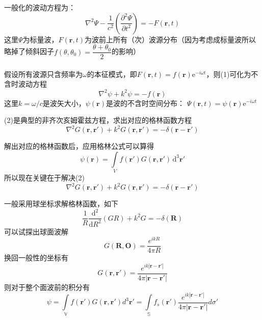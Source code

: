 \documentclass{beamer}
\renewcommand{\bm}{\symbf}
\newenvironment{slide}{
    \begin{frame}{\bfseries{\sectiontitle}}
}{
    \end{frame}
}
\begin{document}
\begin{slide}
    一般化的波动方程为：
    \begin{equation}
        \nabla^2 \Psi - \frac{1}{c^2}\left(\frac{\partial^2 \Psi}{\partial t^2}\right) = -F(\bm{r},t)
    \end{equation}
    这里$\Psi$为标量波，$F(\bm{r},t)$为波前上所有（次）波源分布（因为考虑成标量波所以略掉了倾斜因子$f(\theta,\theta_0)=\dfrac{\theta+\theta_0}{2}$的影响）\\~\\
    假设所有波源只含频率为$\omega$的本征模式，即$F(\bm{r},t)=f(\bm{r})\mathrm{e}^{-i\omega t}$，则(1)可化为不含时波动方程
    \begin{equation}
        \nabla^2 \psi + k^2 \psi = -f(\bm{r})
    \end{equation}
    这里$k=\omega/c$是波矢大小，$\psi(\bm{r})$是波的不含时空间分布：
    $\Psi(\bm{r},t)=\psi(\bm{r})\mathrm{e}^{-i\omega t}$
\end{slide}

\begin{slide}
    (2)是典型的非齐次亥姆霍兹方程，求出对应的格林函数方程
    \begin{equation}
        \nabla^2 G(\bm{r},\bm{r}') + k^2 G(\bm{r},\bm{r}')
        = -\delta(\bm{r}-\bm{r}')
    \end{equation}

    解出对应的格林函数后，应用格林公式可以算得
    \begin{equation}
        \psi(\bm{r}) = \int\limits_{V}f(\bm{r}')G(\bm{r},\bm{r}')\,\mathrm{d}^3\bm{r}'
    \end{equation}
    所以现在关键在于解决(2)
    \begin{equation*}
        \nabla^2 G(\bm{r},\bm{r}') + k^2 G(\bm{r},\bm{r}')
        = -\delta(\bm{r}-\bm{r}')
    \end{equation*}
\end{slide}

\begin{slide}
    一般采用球坐标求解格林函数，如下
    \begin{equation}
        \frac{1}{R} \frac{\mathrm{d}^2}{\mathrm{d} R^2} (GR) +k^2 G
        = -\delta(\bm{R})
    \end{equation}
    可以试探出球面波解
    \begin{equation}
        G(\bm{R},\bm{O}) = \frac{e^{ikR}}{4\pi R}
    \end{equation}
    换回一般性的坐标有
    \begin{equation}
        G(\bm{r},\bm{r}') = \frac{e^{ik |\bm{r}-\bm{r}' | }}{4\pi |\bm{r}-\bm{r}' |}
    \end{equation}
    则对于整个面波前的积分有
    \begin{equation}
        \psi= \int\limits_{\mathbb{V}} f(\bm{r}')G(\bm{r},\bm{r}')d^3\bm{r}' =\int\limits_{\mathbb{S}} f_s(\bm{r}')\frac{e^{i k |\bm{r}- \bm{r}'|}}{4\pi |\bm{r}-\bm{r}'|}d\sigma'
    \end{equation}
\end{slide}
\end{document}
